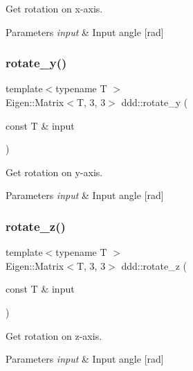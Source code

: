 Get rotation on x-\/axis. 


\begin{DoxyParams}{Parameters}
{\em input} & Input angle \mbox{[}rad\mbox{]} \\
\hline
\end{DoxyParams}
\mbox{\label{namespaceddd_a91c74ff16a602f1f611759e2e9f594f3}} 
\subsubsection{\texorpdfstring{rotate\+\_\+y()}{rotate\_y()}}
{\footnotesize\ttfamily template$<$typename T $>$ \\
Eigen\+::\+Matrix$<$T, 3, 3$>$ ddd\+::rotate\+\_\+y (\begin{DoxyParamCaption}\item[{const T \&}]{input }\end{DoxyParamCaption})\hspace{0.3cm}{\ttfamily [inline]}}



Get rotation on y-\/axis. 


\begin{DoxyParams}{Parameters}
{\em input} & Input angle \mbox{[}rad\mbox{]} \\
\hline
\end{DoxyParams}
\mbox{\label{namespaceddd_a8b9d6f84cbf4f443881fd3b3abad07e4}} 
\subsubsection{\texorpdfstring{rotate\+\_\+z()}{rotate\_z()}}
{\footnotesize\ttfamily template$<$typename T $>$ \\
Eigen\+::\+Matrix$<$T, 3, 3$>$ ddd\+::rotate\+\_\+z (\begin{DoxyParamCaption}\item[{const T \&}]{input }\end{DoxyParamCaption})\hspace{0.3cm}{\ttfamily [inline]}}



Get rotation on z-\/axis. 


\begin{DoxyParams}{Parameters}
{\em input} & Input angle \mbox{[}rad\mbox{]} \\
\hline
\end{DoxyParams}
\mbox{\label{namespaceddd_a3c2355d52318b82d63a4ff3525bb651a}} 
